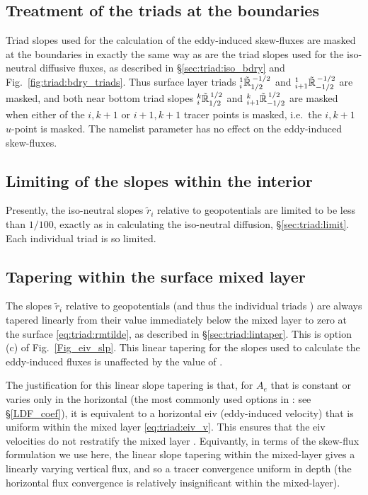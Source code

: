 \subsection{Treatment of the triads at the boundaries}\label{sec:triad:skew_bdry}
Triad slopes  used for the calculation of the eddy-induced skew-fluxes
are masked at the boundaries in exactly the same way as are the triad
slopes  used for the iso-neutral diffusive fluxes, as
described in \S\ref{sec:triad:iso_bdry} and
Fig.~\ref{fig:triad:bdry_triads}. Thus surface layer triads
${}_{i}^{1}{\tilde{\mathbb{R}}}_{1/2}^{\,-1/2}$ and ${}_{i+1}^{1}{\tilde{\mathbb{R}}}_{-1/2}^{\,-1/2}$ are
masked, and both near bottom triad slopes ${}_{i}^{k}{\tilde{\mathbb{R}}}_{1/2}^{\,1/2}$
and ${}_{i+1}^{k}{\tilde{\mathbb{R}}}_{-1/2}^{\,1/2}$ are masked when either of the
$i,k+1$ or $i+1,k+1$ tracer points is masked, i.e.\ the $i,k+1$
$u$-point is masked. The namelist parameter  has
no effect on the eddy-induced skew-fluxes.

\subsection{ Limiting of the slopes within the interior}\label{sec:triad:limitskew}
Presently, the iso-neutral slopes $\tilde{r}_i$ relative
to geopotentials are limited to be less than $1/100$, exactly as in
calculating the iso-neutral diffusion, \S \ref{sec:triad:limit}. Each
individual triad  is so limited.

\subsection{Tapering within the surface mixed layer}\label{sec:triad:taperskew}
The slopes $\tilde{r}_i$ relative to
geopotentials (and thus the individual triads ) are always tapered linearly from their value immediately below the mixed layer to zero at the
surface \eqref{eq:triad:rmtilde}, as described in \S\ref{sec:triad:lintaper}. This is
option (c) of Fig.~\ref{Fig_eiv_slp}. This linear tapering for the
slopes used to calculate the eddy-induced fluxes is
unaffected by the value of .

The justification for this linear slope tapering is that, for $A_e$
that is constant or varies only in the horizontal (the most commonly
used options in \NEMO: see \S\ref{LDF_coef}), it is
equivalent to a horizontal eiv (eddy-induced velocity) that is uniform
within the mixed layer \eqref{eq:triad:eiv_v}. This ensures that the
eiv velocities do not restratify the mixed layer \citep{Treguier1997,
  Danabasoglu_al_2008}. Equivantly, in terms
of the skew-flux formulation we use here, the
linear slope tapering within the mixed-layer gives a linearly varying
vertical flux, and so a tracer convergence uniform in depth (the
horizontal flux convergence is relatively insignificant within the mixed-layer).

